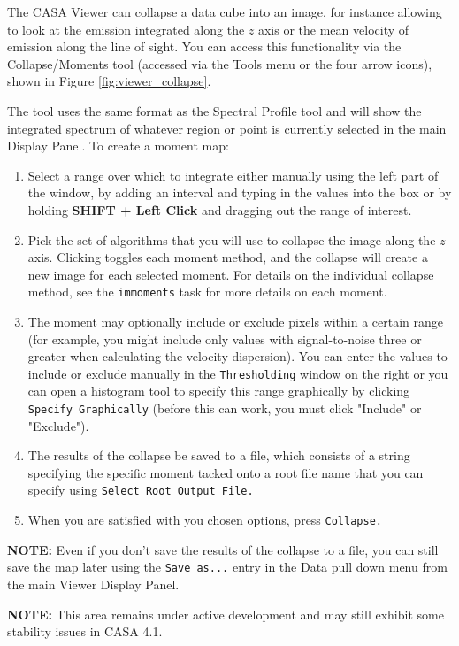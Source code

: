 The CASA Viewer can collapse a data cube into an image, for instance allowing to look at the emission 
integrated along the $z$ axis or the mean velocity of emission along the line of sight. You can
access this functionality via the Collapse/Moments tool (accessed via the Tools menu or the four arrow
icons), shown in Figure \ref{fig:viewer_collapse}.

The tool uses the same format as the Spectral Profile tool and will show the integrated spectrum of whatever region
or point is currently selected in the main Display Panel. To create a moment map:

\begin{enumerate}
\item Select a range over which to integrate either manually using the left part of the window, 
by adding an interval and typing in the values into the box or by holding {\bf SHIFT + Left Click}
and dragging out the range of interest.
\item Pick the set of algorithms that you will use to collapse the image along the $z$ axis. Clicking
toggles each moment method, and the collapse will create a new image for each selected moment.
For details on the individual collapse method, see the {\tt immoments} task for more details on
each moment.
\item The moment may optionally include or exclude pixels within a certain range (for example,
you might include only values with signal-to-noise three or greater when calculating the velocity dispersion). You
can enter the values to include or exclude manually in the {\tt Thresholding} window on the right or you can
open a histogram tool to specify this range graphically by clicking {\tt Specify Graphically} (before this can
work, you must click "Include" or "Exclude").
\item The results of the collapse be saved to a file, which consists of a string specifying the specific moment tacked onto
a root file name that you can specify using {\tt Select Root Output File.}
\item When you are satisfied with you chosen options, press {\tt Collapse.}
\end{enumerate}

{\bf NOTE:} Even if you don't save the results of the collapse to a file, you can still save the map later using the {\tt Save as...} entry in the 
Data pull down menu from the main Viewer Display Panel.

{\bf NOTE:} This area remains under active development and may still exhibit some stability issues in CASA 4.1.

